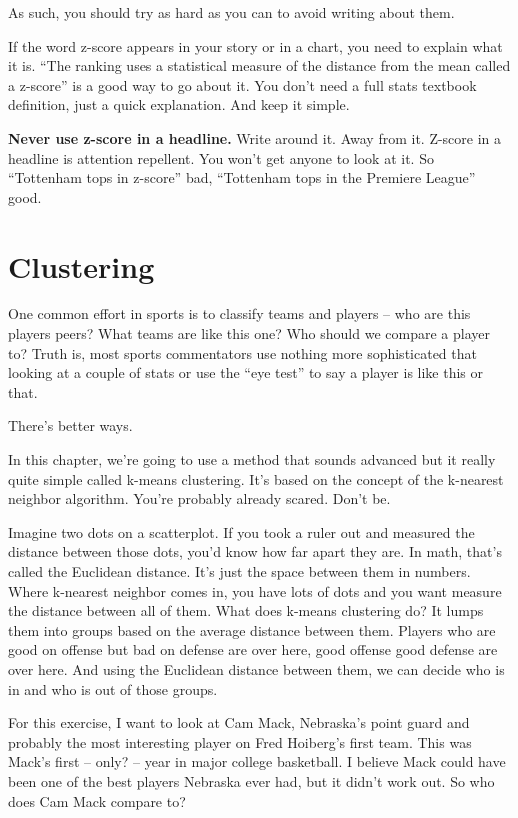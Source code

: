 \documentclass[
  letterpaper,
  DIV=11,
  numbers=noendperiod]{scrreprt}
\begin{document}
As such, you should try as hard as you can to avoid writing about them.

If the word z-score appears in your story or in a chart, you need to
explain what it is. ``The ranking uses a statistical measure of the
distance from the mean called a z-score'' is a good way to go about it.
You don't need a full stats textbook definition, just a quick
explanation. And keep it simple.

\textbf{Never use z-score in a headline.} Write around it. Away from it.
Z-score in a headline is attention repellent. You won't get anyone to
look at it. So ``Tottenham tops in z-score'' bad, ``Tottenham tops in
the Premiere League'' good.


\hypertarget{clustering}{%
\chapter{Clustering}\label{clustering}}

One common effort in sports is to classify teams and players -- who are
this players peers? What teams are like this one? Who should we compare
a player to? Truth is, most sports commentators use nothing more
sophisticated that looking at a couple of stats or use the ``eye test''
to say a player is like this or that.

There's better ways.

In this chapter, we're going to use a method that sounds advanced but it
really quite simple called k-means clustering. It's based on the concept
of the k-nearest neighbor algorithm. You're probably already scared.
Don't be.

Imagine two dots on a scatterplot. If you took a ruler out and measured
the distance between those dots, you'd know how far apart they are. In
math, that's called the Euclidean distance. It's just the space between
them in numbers. Where k-nearest neighbor comes in, you have lots of
dots and you want measure the distance between all of them. What does
k-means clustering do? It lumps them into groups based on the average
distance between them. Players who are good on offense but bad on
defense are over here, good offense good defense are over here. And
using the Euclidean distance between them, we can decide who is in and
who is out of those groups.

For this exercise, I want to look at Cam Mack, Nebraska's point guard
and probably the most interesting player on Fred Hoiberg's first team.
This was Mack's first -- only? -- year in major college basketball. I
believe Mack could have been one of the best players Nebraska ever had,
but it didn't work out. So who does Cam Mack compare to?
\end{document}
